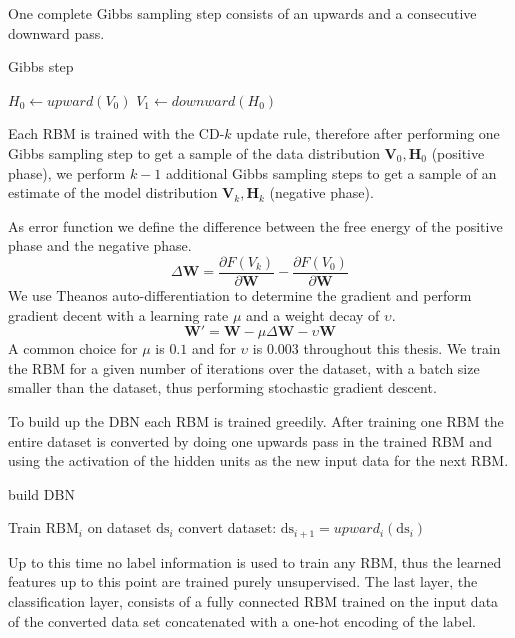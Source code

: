 One complete Gibbs sampling step consists of an upwards and a consecutive downward pass.

\begin{algorithm}
\caption{Gibbs step}
\begin{algorithmic}
\State $H_0 \gets upward(V_0) $  
\State $V_1 \gets downward(H_0) $  
\end{algorithmic}
\end{algorithm}

Each RBM is trained with the CD-$k$ update rule, therefore after performing one Gibbs sampling step to get a sample of the data distribution $\textbf{V}_0, \textbf{H}_0$  (positive phase), we perform $k-1$ additional Gibbs sampling steps to get a sample of an estimate of the model distribution $\textbf{V}_k, \textbf{H}_k$  (negative phase).

As error function we define the difference between the free energy of the positive phase and the negative phase.
\[
\Delta \textbf{W} = \frac{\partial F(V_k)}{\partial \textbf{W}} -  \frac{\partial F(V_0)}{\partial \textbf{W}} 
\]
We use Theanos auto-differentiation to determine the gradient and perform gradient decent with a learning rate $\mu$ and a weight decay of $\upsilon$.
\[
\textbf{W}' = \textbf{W} - \mu \Delta \textbf{W} - \upsilon \textbf{W} 
\]
A common choice for $\mu$ is $0.1$ and for $\upsilon$ is $0.003$ throughout this thesis.
We train the RBM for a given number of iterations over the dataset, with a batch size smaller than the dataset, thus performing stochastic gradient descent.

To build up the DBN each RBM is trained greedily.
After training one RBM the entire dataset is converted by doing one upwards pass in the trained RBM and using the activation of the hidden units as the new input data for the next RBM.

\begin{algorithm}
\caption{build DBN}
\begin{algorithmic}
\State Train $\text{RBM}_i$ on dataset $\text{ds}_i$
\State convert dataset: $\text{ds}_{i+1} = upward_i(\text{ds}_i)$ 
\EndFor
\end{algorithmic}
\end{algorithm}

Up to this time no label information is used to train any RBM, thus the learned features up to this point are trained purely unsupervised.
The last layer, the classification layer, consists of a fully connected RBM trained on the input data of the converted data set concatenated with a one-hot encoding of the label.



